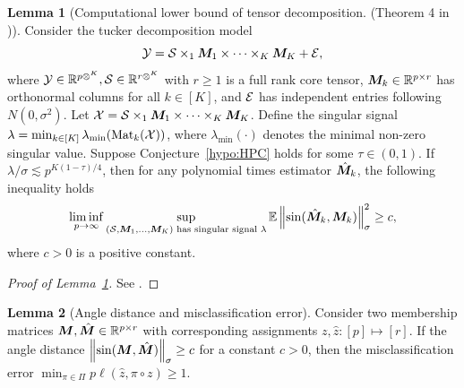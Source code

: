 \documentclass[lettersize,journal]{IEEEtran}
\theoremstyle{definition}
\newtheorem{lem}{Lemma}
\theoremstyle{definition}
\newcommand{\Mat}{\text{Mat}}
\def\fixme#1#2{\textbf{\color{red}[FIXME (#1): #2]}}
\begin{document}
\begin{lem}[Computational lower bound of tensor decomposition. (Theorem 4 in \cite{zhang2018tensor})]\label{lem:hpc} Consider the tucker decomposition model 
\begin{equation}
    \mathcal{Y} = \mathcal{S} \times_1 \bm M_1 \times \cdots \times_K \bm M_K + \mathcal{E},
\end{equation}
where $\mathcal{Y} \in \mathbb{R}^{p\otimes^K }, \mathcal{S} \in \mathbb{R}^{r \otimes^K}$ with $r \geq 1$ is a full rank core tensor, $\bm M_k \in \mathbb{R}^{p \times r}$ has orthonormal columns for all $k \in [K]$, and $\mathcal{E}$ has independent entries following $N(0,\sigma^2)$. Let $\mathcal{X} = \mathcal{S} \times_1 \bm M_1 \times \cdots \times_K \bm M_K $. Define the singular signal $\lambda = \min_{k \in [K]}\lambda_{\min} (\Mat_k(\tX))$, where $\lambda_{\min}(\cdot)$ denotes the minimal non-zero singular value. Suppose Conjecture~\ref{hypo:HPC} holds for some $\tau \in (0,1)$. If $\lambda /\sigma \lesssim p^{K(1- \tau)/4}$, then for any polynomial times estimator $\hat {\bm M}_k$, the following inequality holds
\begin{align}
    \liminf_{p \rightarrow \infty} \sup_{(\mathcal{S}, \bm M_1,...,\bm M_K) \text{ has singular signal }\lambda} \mathbb{E} \left\lVert \sin(\hat {\bm M}_k, \bm M_k) \right\rVert^2_{\sigma} \geq c,
\end{align}
where $c >0$ is a positive constant. 
\end{lem}

\begin{proof}[Proof of Lemma~\ref{lem:hpc}]
See \citet[Proof of Theorem 4]{zhang2018tensor}.
\end{proof}


\begin{lem}[Angle distance and misclassification error]\label{lem:angle_mcr} Consider two membership matrices $\bm M, \hat {\bm M} \in \mathbb{R}^{p \times r}$ with corresponding assignments $z, \hat z: [p] \mapsto [r]$. If the angle distance $\left\lVert\sin (\bm M, \hat {\bm M})\right\rVert_{\sigma} \geq c$ for a constant $c >0$, then the misclassification error $\min_{\pi \in \Pi}p\ell(\hat z,\pi \circ z )\geq 1$.
\end{lem}
\end{document}
